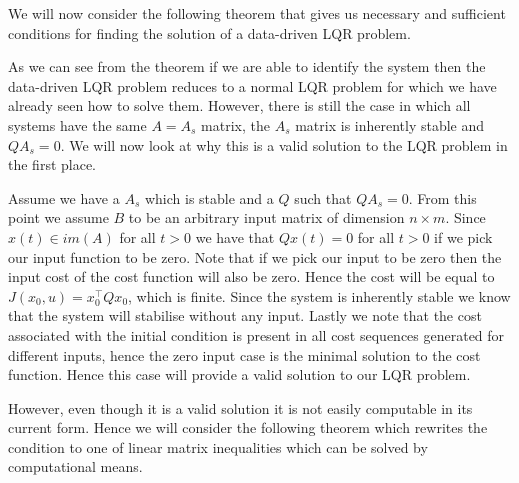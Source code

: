 We will now consider the following theorem that gives us necessary and sufficient conditions for finding the solution of a data-driven LQR problem.


As we can see from the theorem if we are able to identify the system then the data-driven LQR problem reduces to a normal LQR problem for which we have already seen how to solve them. However, there is still the case in which all systems have the same $A = A_s$ matrix, the $A_s$ matrix is inherently stable and $QA_s = 0$. We will now look at why this is a valid solution to the LQR problem in the first place.

Assume we have a $A_s$ which is stable and a $Q$ such that $QA_s = 0$. From this point we assume $B$ to be an arbitrary input matrix of dimension $n \times m$. Since $x(t) \in im(A)$ for all $t > 0$ we have that $Qx(t) = 0$ for all $t>0$ if we pick our input function to be zero. Note that if we pick our input to be zero then the input cost of the cost function will also be zero. Hence the cost will be equal to $J(x_0 , u) = x_0^\top Q x_0$, which is finite. Since the system is inherently stable we know that the system will stabilise without any input. Lastly we note that the cost associated with the initial condition is present in all cost sequences generated for different inputs, hence the zero input case is the minimal solution to the cost function. Hence this case will provide a valid solution to our LQR problem.

However, even though it is a valid solution it is not easily computable in its current form. Hence we will consider the following theorem which rewrites the condition to one of linear matrix inequalities which can be solved by computational means.

